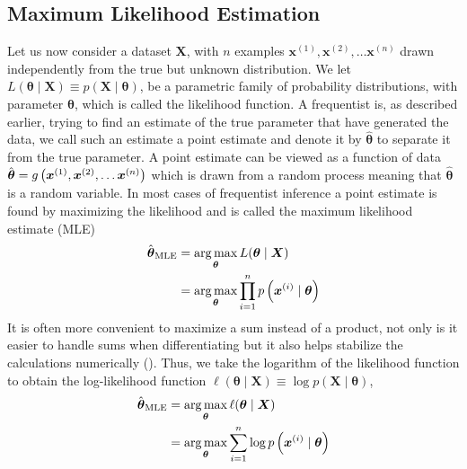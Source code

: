 \subsection{Maximum Likelihood Estimation} \label{sec:mle}
Let us now consider a dataset $\boldsymbol{X}$, with $n$ examples $\boldsymbol{x}^{(1)}, \boldsymbol{x}^{(2)},\ldots \boldsymbol{x}^{(n)}$ drawn independently from the true but unknown distribution. We let
$L(\boldsymbol{\theta}\mid \boldsymbol{X})\equiv p(\boldsymbol{X}\mid \boldsymbol{\theta})$, be a parametric family of probability distributions, with parameter $\boldsymbol{\theta}$, which is called the likelihood function. A frequentist is, as described earlier, trying to find an estimate of the true parameter that have generated the data, we call such an estimate a point estimate and denote it by $\hat{\boldsymbol{\theta}}$ to separate it from the true parameter. A point estimate can be viewed as a function of data $\hat{\boldsymbol{\theta}}=g\left (\boldsymbol{x}^{(1)}, \boldsymbol{x}^{(2)},\ldots \boldsymbol{x}^{(n)}\right)$ which is drawn from a random process meaning that $\hat{\boldsymbol{\theta}}$ is a random variable.
In most cases of frequentist inference a point estimate is found by maximizing the likelihood and is called the maximum likelihood estimate (MLE)
\begin{equation*}
\begin{split}
       \hat{\boldsymbol{\theta}}_{\text{MLE}}&=\operatorname*{arg\,max}_{\boldsymbol{\theta}}{L(\boldsymbol{\theta}\mid \boldsymbol{X})}\\
        & = \operatorname*{arg\,max}_{\boldsymbol{\theta}}{\prod^n_{i=1}p\left (\boldsymbol{x}^{(i)}\mid \boldsymbol{\theta}\right)}
\end{split}
\end{equation*}
It is often more convenient to maximize a sum instead of a product, not only is it easier to handle sums when differentiating but it also helps stabilize the calculations numerically (\cite{Goodfellow-et-al-2016}). Thus, we take the logarithm of the likelihood function to obtain the log-likelihood function $\ell(\boldsymbol{\theta}\mid \boldsymbol{X})\equiv \log{p(\boldsymbol{X}\mid \boldsymbol{\theta})}$,
\begin{equation*}
\begin{split}
       \hat{\boldsymbol{\theta}}_{\text{MLE}}&=\operatorname*{arg\,max}_{\boldsymbol{\theta}}{\ell(\boldsymbol{\theta}\mid \boldsymbol{X})}\\
        &=\operatorname*{arg\,max}_{\boldsymbol{\theta}}{\sum^n_{i=1}\log{p\left (\boldsymbol{x}^{(i)}\mid\boldsymbol{\theta}\right)}}
\end{split}
\end{equation*}
